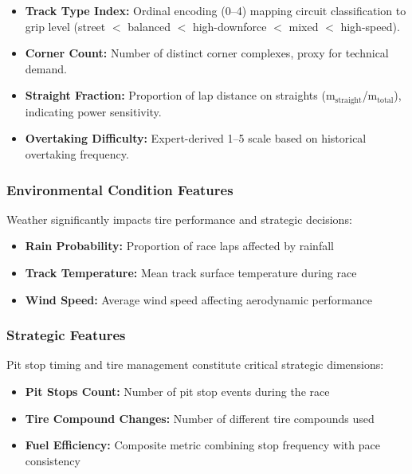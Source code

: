 \documentclass[conference]{IEEEtran}
\begin{document}
\begin{itemize}
    \item \textbf{Track Type Index:} Ordinal encoding (0--4) mapping circuit classification to grip level (street $<$ balanced $<$ high-downforce $<$ mixed $<$ high-speed).
    \item \textbf{Corner Count:} Number of distinct corner complexes, proxy for technical demand.
    \item \textbf{Straight Fraction:} Proportion of lap distance on straights (m$_{\text{straight}}$/m$_{\text{total}}$), indicating power sensitivity.
    \item \textbf{Overtaking Difficulty:} Expert-derived 1--5 scale based on historical overtaking frequency.
\end{itemize}

\subsubsection{Environmental Condition Features}

Weather significantly impacts tire performance and strategic decisions:

\begin{itemize}
    \item \textbf{Rain Probability:} Proportion of race laps affected by rainfall
    \item \textbf{Track Temperature:} Mean track surface temperature during race
    \item \textbf{Wind Speed:} Average wind speed affecting aerodynamic performance
\end{itemize}

\subsubsection{Strategic Features}

Pit stop timing and tire management constitute critical strategic dimensions:

\begin{itemize}
    \item \textbf{Pit Stops Count:} Number of pit stop events during the race
    \item \textbf{Tire Compound Changes:} Number of different tire compounds used
    \item \textbf{Fuel Efficiency:} Composite metric combining stop frequency with pace consistency
\end{itemize}
\end{document}
